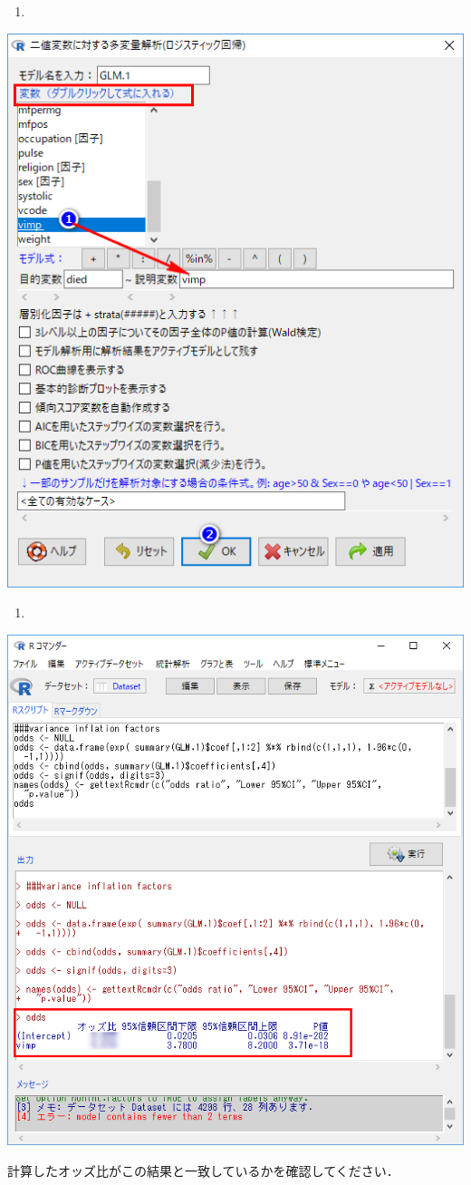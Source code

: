 \documentclass[11pt,]{problemset}
\begin{document}
\begin{enumerate}
\def\labelenumi{\arabic{enumi}.}
\setcounter{enumi}{7}
\item
\end{enumerate}

\begin{center}\includegraphics[width=0.5\linewidth]{pic/logstic07} \end{center}

\newpage

\begin{enumerate}
\def\labelenumi{\arabic{enumi}.}
\setcounter{enumi}{8}
\item
\end{enumerate}

\begin{center}\includegraphics[width=0.55\linewidth]{pic/logstic08cut} \end{center}

計算したオッズ比がこの結果と一致しているかを確認してください．
\end{document}
